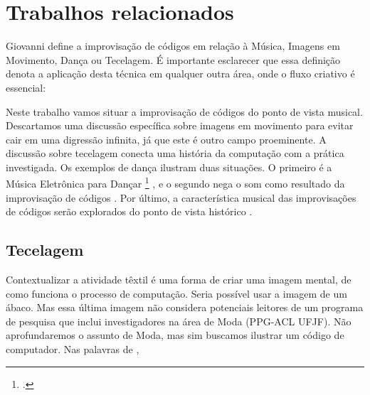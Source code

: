 \chapter{Trabalhos relacionados}\label{cap:introducao}

Giovanni  define a improvisação de códigos em relação à Música, Imagens em Movimento, Dança ou Tecelagem. É importante esclarecer que essa definição denota a aplicação desta técnica em qualquer outra área, onde o fluxo criativo é essencial:

\begin{citacao}
\end{citacao}

Neste trabalho vamos situar a improvisação de códigos do ponto de vista musical. Descartamos uma discussão específica sobre imagens em movimento para evitar cair em uma digressão infinita, já que este é outro campo proeminente. A discussão sobre tecelagem  conecta uma história da computação com a prática investigada. Os exemplos de dança  ilustram duas situações. O primeiro é a Música Eletrônica para Dançar \footnote{.} , e o segundo nega o som como resultado da improvisação de códigos . Por último, a característica musical das improvisações de códigos serão explorados do ponto de vista histórico .

\section{Tecelagem}\label{sec:tecelagem}

Contextualizar a atividade têxtil é uma forma de criar uma imagem mental, de como funciona o processo de computação. Seria possível usar a imagem de um ábaco. Mas essa última imagem não considera potenciais leitores de um programa de pesquisa que inclui investigadores na área de Moda (PPG-ACL UFJF). Não aprofundaremos o assunto de Moda, mas sim buscamos ilustrar um código de computador. Nas palavras de ,

